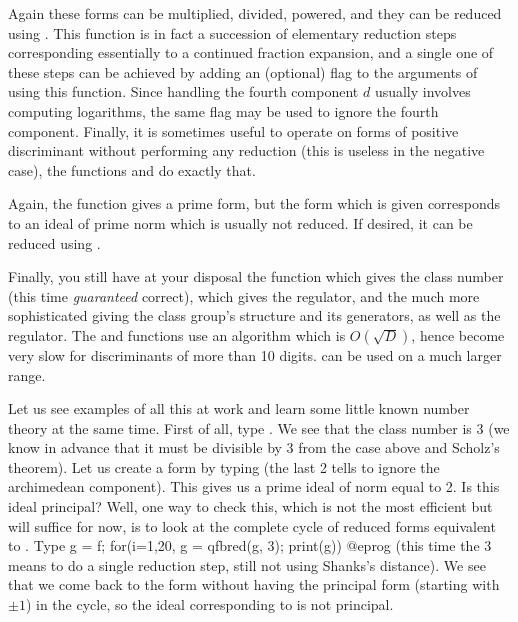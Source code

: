 Again these forms can be multiplied, divided, powered, and they can be
reduced using . This function is in fact a succession of
elementary reduction steps corresponding essentially to a continued fraction
expansion, and a single one of these steps can be achieved by adding an
(optional) flag to the arguments of using this function. Since handling the
fourth component $d$ usually involves computing logarithms, the same flag may
be used to ignore the fourth component. Finally, it is sometimes useful to
operate on forms of positive discriminant without performing any reduction
(this is useless in the negative case), the functions  and
 do exactly that.

Again, the function  gives a prime form, but the form which
is given corresponds to an ideal of prime norm which is usually not reduced.
If desired, it can be reduced using .

Finally, you still have at your disposal the function  which
gives the class number (this time \emph{guaranteed} correct),
 which gives the regulator, and the much more sophisticated
 giving the class group's structure and its generators,
as well as the regulator. The  and 
functions use an algorithm which is $O(\sqrt D)$, hence become very slow for
discriminants of more than 10 digits.  can be used on a
much larger range.

Let us see examples of all this at work and learn some little known number
theory at the same time. First of all, type
. We see that the class number is 3 (we know
in advance that it must be divisible by 3 from the  case above
and Scholz's theorem). Let us create a form by typing
 (the last 2 tells  to
ignore the archimedean component). This gives us a prime ideal of norm
equal to 2. Is this ideal principal? Well, one way to check this, which is
not the most efficient but will suffice for now, is to look at the complete
cycle of reduced forms equivalent to . Type
\bprog
 g = f; for(i=1,20, g = qfbred(g, 3); print(g))
@eprog\noindent
(this time the 3 means to do a single reduction step, still not using
Shanks's distance). We see that we come back to the form  without
having the principal form (starting with $\pm1$) in the cycle, so the ideal
corresponding to  is not principal.


